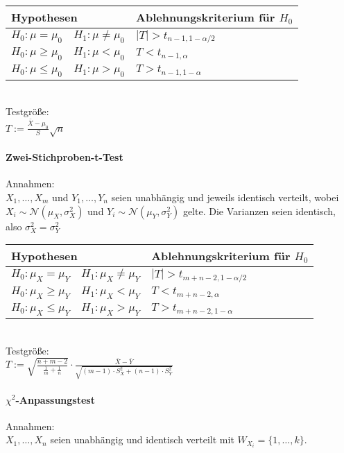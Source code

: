 \documentclass[a4paper,9pt]{extarticle}
\begin{document}
\begin{tabular}{l @{ gegen } l|l}
	\multicolumn{2}{l}{Hypothesen} & Ablehnungskriterium für $H_0$\\
	\hline
	$H_0 : \mu = \mu_0$ & $H_1 : \mu ≠ \mu_0$ & $|T| > t_{n - 1, 1 - \alpha/2}$ \\
	$H_0 : \mu ≥ \mu_0$ & $H_1 : \mu < \mu_0$ & $T < t_{n - 1, \alpha}$ \\
	$H_0 : \mu ≤ \mu_0$ & $H_1 : \mu > \mu_0$ & $T > t_{n - 1, 1 - \alpha}$ \\
\end{tabular} \\

Testgröße: \\
$T := \frac{\bar{X} - \mu_0}{S}\sqrt{n}$\\

\paragraph*{Zwei-Stichproben-t-Test}
Annahmen: \\
$X_1, \dots, X_m$ und $Y_1, \dots, Y_n$ seien unabhängig und jeweils identisch verteilt, wobei $X_i \sim \mathcal{N}(\mu_X, \sigma_X^2)$ und $Y_i \sim \mathcal{N}(\mu_Y, \sigma_Y^2)$ gelte. Die Varianzen seien identisch, also $\sigma_X^2 = \sigma_Y^2$ \\

\begin{tabular}{l @{ gegen } l|l}
	\multicolumn{2}{l}{Hypothesen} & Ablehnungskriterium für $H_0$\\
	\hline
	$H_0 : \mu_X = \mu_Y$ & $H_1 : \mu_X ≠ \mu_Y$ & $|T| > t_{m + n - 2, 1 - \alpha/2}$ \\
	$H_0 : \mu_X ≥ \mu_Y$ & $H_1 : \mu_X < \mu_Y$ & $T < t_{m + n - 2, \alpha}$ \\
	$H_0 : \mu_X ≤ \mu_Y$ & $H_1 : \mu_X > \mu_Y$ & $T > t_{m + n - 2, 1 - \alpha}$ \\
\end{tabular} \\

Testgröße: \\
$T := \sqrt{\frac{n + m - 2}{\frac 1 m + \frac 1 n}} ⋅ \frac{\bar{X} - \bar{Y}}{\sqrt{(m - 1) ⋅ S_X^2 + (n - 1) ⋅ S_Y^2}}$

\paragraph*{$\chi^2$-Anpassungstest}
Annahmen: \\
$X_1, \dots, X_n$ seien unabhängig und identisch verteilt mit $W_{X_i} = \{1, \dots, k\}$. \\
\end{document}
